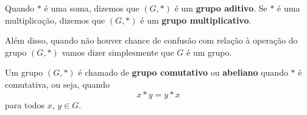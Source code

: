 \begin{observacao}
    Quando $*$ {\'e} uma soma, dizemos que $(G,*)$ {\'e} um \textbf{grupo aditivo}. Se $*$ {\'e} uma multiplica{\c c}{\~a}o, dizemos que $(G,*)$ {\'e} um \textbf{grupo multiplicativo}.

    Al\'em disso, quando n\~ao houver chance de confus\~ao com rela\c{c}\~ao \`a opera\c{c}\~ao do grupo $(G, *)$ vamos dizer simplesmente que $G$ \'e um grupo.
\end{observacao}

\begin{definicao}
    Um grupo $(G,*)$ {\'e} chamado de \textbf{grupo comutativo} ou \textbf{abeliano} quando $*$ {\'e} comutativa, ou seja, quando
    \[
        x*y = y*x
    \]
    para todos $x$, $y \in G$.
\end{definicao}

